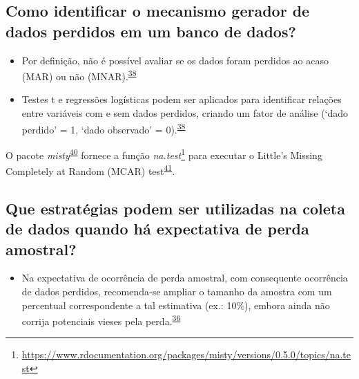 \documentclass[
  a4paper,
]{book}
\providecommand{\tightlist}{%
  \setlength{\itemsep}{0pt}\setlength{\parskip}{0pt}}
\renewcommand{\href}[2]{#2\footnote{\url{#1}}}
\newenvironment{infobox}[1]
  {
  \begin{itemize}
  \renewcommand{\labelitemi}{
    \raisebox{-.7\height}[0pt][0pt]{
      {\setkeys{Gin}{width=3em,keepaspectratio}
        \texttt{[image: \#1]}}
    }
  }
  \setlength{\fboxsep}{1em}
  \begin{blackbox}
  \item
  }
  {
  \end{blackbox}
  \end{itemize}
  }
\begin{document}
\hypertarget{como-identificar-o-mecanismo-gerador-de-dados-perdidos-em-um-banco-de-dados}{%
\subsection{Como identificar o mecanismo gerador de dados perdidos em um banco de dados?}\label{como-identificar-o-mecanismo-gerador-de-dados-perdidos-em-um-banco-de-dados}}

\begin{itemize}
\item
  Por definição, não é possível avaliar se os dados foram perdidos ao acaso (MAR) ou não (MNAR).\textsuperscript{\protect\hyperlink{ref-Heymans2022}{38}}
\item
  Testes t e regressões logísticas podem ser aplicados para identificar relações entre variáveis com e sem dados perdidos, criando um fator de análise (`dado perdido' = 1, `dado observado' = 0).\textsuperscript{\protect\hyperlink{ref-Heymans2022}{38}}
\end{itemize}

\begin{infobox}{images/Rlogo}
O pacote \emph{misty}\textsuperscript{\protect\hyperlink{ref-misty}{40}} fornece a função \href{https://www.rdocumentation.org/packages/misty/versions/0.5.0/topics/na.test}{\emph{na.test}} para executar o Little's Missing Completely at Random (MCAR) test\textsuperscript{\protect\hyperlink{ref-little1988}{41}}.

\end{infobox}

\hypertarget{que-estratuxe9gias-podem-ser-utilizadas-na-coleta-de-dados-quando-huxe1-expectativa-de-perda-amostral}{%
\subsection{Que estratégias podem ser utilizadas na coleta de dados quando há expectativa de perda amostral?}\label{que-estratuxe9gias-podem-ser-utilizadas-na-coleta-de-dados-quando-huxe1-expectativa-de-perda-amostral}}

\begin{itemize}
\tightlist
\item
  Na expectativa de ocorrência de perda amostral, com consequente ocorrência de dados perdidos, recomenda-se ampliar o tamanho da amostra com um percentual correspondente a tal estimativa (ex.: 10\%), embora ainda não corrija potenciais vieses pela perda.\textsuperscript{\protect\hyperlink{ref-Altman2007}{36}}
\end{itemize}
\end{document}
